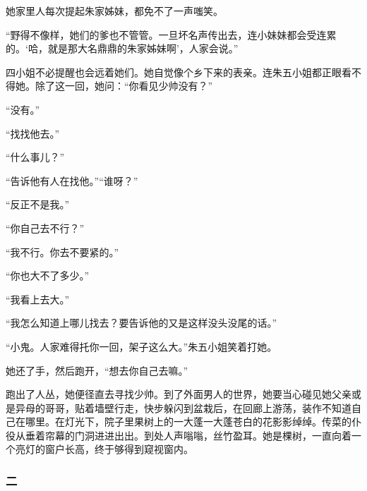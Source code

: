\par 她家里人每次提起朱家姊妹，都免不了一声嗤笑。
\par “野得不像样，她们的爹也不管管。一旦坏名声传出去，连小妹妹都会受连累的。‘哈，就是那大名鼎鼎的朱家姊妹啊’，人家会说。”
\par 四小姐不必提醒也会远着她们。她自觉像个乡下来的表亲。连朱五小姐都正眼看不得她。除了这一回，她问：“你看见少帅没有？”
\par “没有。”
\par “找找他去。”
\par “什么事儿？”
\par “告诉他有人在找他。”“谁呀？”
\par “反正不是我。”
\par “你自己去不行？”
\par “我不行。你去不要紧的。”
\par “你也大不了多少。”
\par “我看上去大。”
\par “我怎么知道上哪儿找去？要告诉他的又是这样没头没尾的话。”
\par “小鬼。人家难得托你一回，架子这么大。”朱五小姐笑着打她。
\par 她还了手，然后跑开，“想去你自己去嘛。”
\par 跑出了人丛，她便径直去寻找少帅。到了外面男人的世界，她要当心碰见她父亲或是异母的哥哥，贴着墙壁行走，快步躲闪到盆栽后，在回廊上游荡，装作不知道自己在哪里。在灯光下，院子里果树上的一大蓬一大蓬苍白的花影影绰绰。传菜的仆役从垂着帘幕的门洞进进出出。到处人声嗡嗡，丝竹盈耳。她是棵树，一直向着一个亮灯的窗户长高，终于够得到窥视窗内。





\subsubsection*{二}


